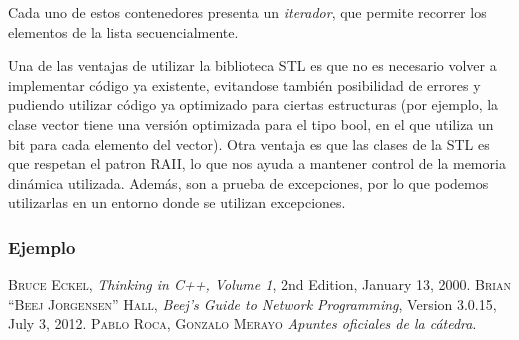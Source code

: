 \documentclass[a4paper, twoside]{article}
\newcommand{\codedir}{../resources/code} %
\begin{document}
Cada uno de estos contenedores presenta un \emph{iterador}, que permite recorrer los elementos de la lista secuencialmente.

Una de las ventajas de utilizar la biblioteca STL es que no es necesario volver a implementar código ya existente, evitandose también posibilidad de errores y pudiendo utilizar código ya optimizado para ciertas estructuras (por ejemplo, la clase vector tiene una versión optimizada para el tipo bool, en el que utiliza un bit para cada elemento del vector).
Otra ventaja es que las clases de la STL es que respetan el patron RAII, lo que nos ayuda a mantener control de la memoria dinámica utilizada. Además, son a prueba de excepciones, por lo que podemos utilizarlas en un entorno donde se utilizan excepciones.

\subsubsection{Ejemplo}



\newpage
\newcommand{\bibliographyname}{Bibliografía} %
\addcontentsline{toc}{section}{\bibliographyname} %
\renewcommand\refname{\bibliographyname} %
\begin{thebibliography}{X}
	 \textsc{Bruce Eckel}, \textit{Thinking in C++, Volume 1}, 2nd Edition, January 13, 2000.
	 \textsc{Brian “Beej Jorgensen” Hall}, \textit{Beej's Guide to Network Programming}, Version 3.0.15, July 3, 2012.
	 \textsc{Pablo Roca, Gonzalo Merayo} \textit{Apuntes oficiales de la cátedra}.
\end{thebibliography}

\makeseccioncolaboradores %

\makehistorial
\end{document}
